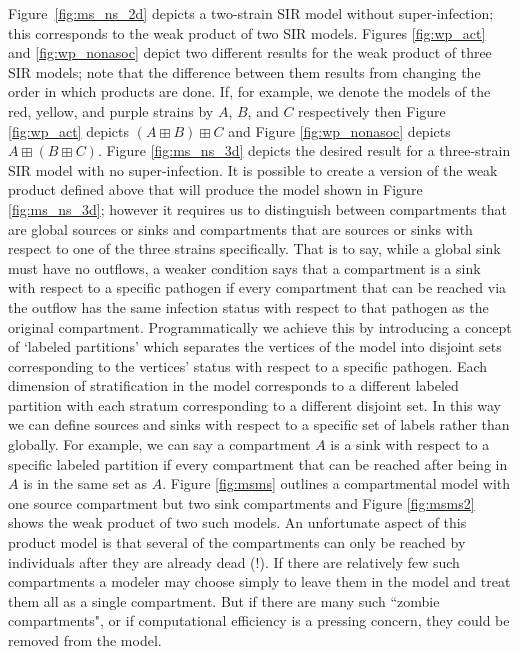 Figure~\ref{fig:ms_ns_2d} depicts a two-strain SIR model without super-infection; this corresponds to the weak product of two SIR models. Figures \ref{fig:wp_act} and \ref{fig:wp_nonasoc} depict two different results for the weak product of three SIR models; note that the difference between them results from changing the order in which products are done. If, for example, we denote the models of the red, yellow, and purple strains by $A$, $B$, and $C$ respectively then Figure \ref{fig:wp_act} depicts $(A\boxplus B)\boxplus C$ and Figure \ref{fig:wp_nonasoc} depicts $A\boxplus (B\boxplus C)$. Figure \ref{fig:ms_ns_3d} depicts the desired result for a three-strain SIR model with no super-infection. It is possible to create a version of the weak product defined above that will produce the model shown in Figure \ref{fig:ms_ns_3d}; however it requires us to distinguish between compartments that are global sources or sinks and compartments that are sources or sinks with respect to one of the three strains specifically. That is to say, while a global sink must have no outflows, a weaker condition says that a compartment is a sink with respect to a specific pathogen if every compartment that can be reached via the outflow has the same infection status with respect to that pathogen as the original compartment. Programmatically we achieve this by introducing a concept of `labeled partitions' which separates the vertices of the model into disjoint sets corresponding to the vertices' status with respect to a specific pathogen. Each dimension of stratification in the model corresponds to a different labeled partition with each stratum corresponding to a different disjoint set. In this way we can define sources and sinks with respect to a specific set of labels rather than globally. For example, we can say a compartment $A$ is a sink with respect to a specific labeled partition if every compartment that can be reached after being in $A$ is in the same set as $A$. Figure \ref{fig:msms} outlines a compartmental model with one source compartment but two sink compartments and Figure \ref{fig:msms2} shows the weak product of two such models.
An unfortunate aspect of this product model is that several of the compartments can only be reached by individuals after they are already dead (!).
If there are relatively few such compartments a modeler may choose simply to leave them in the model and treat them all as a single compartment. But if there are many such ``zombie compartments", or if computational efficiency is a pressing concern, they could be removed  from the model.

